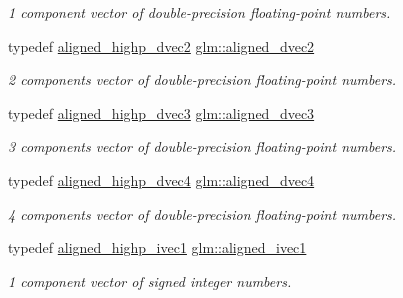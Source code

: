 \begin{DoxyCompactItemize}
\begin{DoxyCompactList}\small\item\em 1 component vector of double-\/precision floating-\/point numbers. \end{DoxyCompactList}\item 
\mbox{\label{group__gtc__type__aligned_ga1e6972e837bc34b3424af8d63a71d7c6}} 
typedef \hyperlink{group__gtc__type__aligned_gaaaaceecde7bb178eebc873836c7e6009}{aligned\+\_\+highp\+\_\+dvec2} \hyperlink{group__gtc__type__aligned_ga1e6972e837bc34b3424af8d63a71d7c6}{glm\+::aligned\+\_\+dvec2}
\begin{DoxyCompactList}\small\item\em 2 components vector of double-\/precision floating-\/point numbers. \end{DoxyCompactList}\item 
\mbox{\label{group__gtc__type__aligned_ga82da11893fbac3bda647c9de9da62693}} 
typedef \hyperlink{group__gtc__type__aligned_ga8f0cf063fb87e4bd3a26ec242a71d75d}{aligned\+\_\+highp\+\_\+dvec3} \hyperlink{group__gtc__type__aligned_ga82da11893fbac3bda647c9de9da62693}{glm\+::aligned\+\_\+dvec3}
\begin{DoxyCompactList}\small\item\em 3 components vector of double-\/precision floating-\/point numbers. \end{DoxyCompactList}\item 
\mbox{\label{group__gtc__type__aligned_ga502d8d084a488118c9a5466d73ba1a46}} 
typedef \hyperlink{group__gtc__type__aligned_ga96f78b78823a228d1ca0cfa3be7e6a64}{aligned\+\_\+highp\+\_\+dvec4} \hyperlink{group__gtc__type__aligned_ga502d8d084a488118c9a5466d73ba1a46}{glm\+::aligned\+\_\+dvec4}
\begin{DoxyCompactList}\small\item\em 4 components vector of double-\/precision floating-\/point numbers. \end{DoxyCompactList}\item 
\mbox{\label{group__gtc__type__aligned_gafe9657c41fa58e912f99e92284d79fce}} 
typedef \hyperlink{structglm_1_1tvec1}{aligned\+\_\+highp\+\_\+ivec1} \hyperlink{group__gtc__type__aligned_gafe9657c41fa58e912f99e92284d79fce}{glm\+::aligned\+\_\+ivec1}
\begin{DoxyCompactList}\small\item\em 1 component vector of signed integer numbers. \end{DoxyCompactList}\item 

\end{DoxyCompactItemize}
